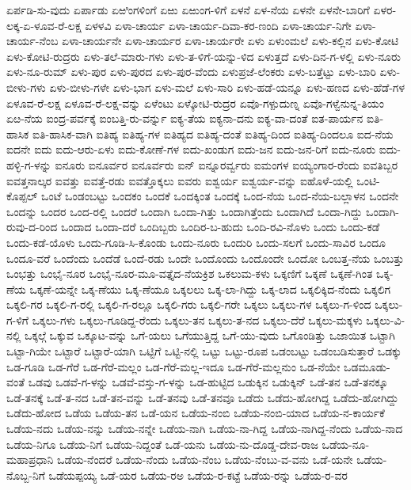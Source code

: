 ಏರ್ಪಡಿ-ಸು-ವುದು
ಏರ್ಪಾಡು
ಏಱಿಂಗಳಿಂಗೆ
ಏಱು
ಏಱುಂಗ-ಳಿಗೆ
ಏಳನೆ
ಏಳ-ನೆಯ
ಏಳನೇ
ಏಳನೇ-ಬಾರಿಗೆ
ಏಳರ-ಲಕ್ಕ-ಏ-ಳೂವ-ರೆ-ಲಕ್ಷ
ಏಳಳವಿ
ಏಳಾ-ಚಾರ್ಯ
ಏಳಾ-ಚಾರ್ಯ-ದಿವಾ-ಕರ-ಣಂದಿ
ಏಳಾ-ಚಾರ್ಯ-ನಿಗೇ
ಏಳಾ-ಚಾರ್ಯ-ನೆಂಬ
ಏಳಾ-ಚಾರ್ಯನೇ
ಏಳಾ-ಚಾರ್ಯರ
ಏಳಾ-ಚಾರ್ಯರೇ
ಏಳು
ಏಳುಂಮಲೆ
ಏಳು-ಕಲ್ಲಿನ
ಏಳು-ಕೋಟಿ
ಏಳು-ಕೋಟಿ-ರುದ್ರರು
ಏಳು-ತಲೆ-ಮಾರು-ಗಳು
ಏಳು-ತ-ಳಿಗೆ-ಯನ್ನು-ಳಿದ
ಏಳುತ್ತದೆ
ಏಳು-ದಿನ-ಗ-ಳಲ್ಲಿ
ಏಳು-ನೂರು
ಏಳು-ನೂ-ರುಮ್
ಏಳು-ಪುರ
ಏಳು-ಪುರದ
ಏಳು-ಪುರ-ವೆಂದು
ಏಳುಪ್ರಜೆ-ಲೆಂಕರು
ಏಳು-ಬತ್ತೆಟ್ಟು
ಏಳು-ಬಾರಿ
ಏಳು-ಬೀಳು-ಗಳು
ಏಳು-ಬೀಳು-ಗಳೇ
ಏಳು-ಭಾಗ
ಏಳು-ಮಲೆ
ಏಳು-ಸಾರಿ
ಏಳು-ಹಡೆ-ಯನ್ನೂ
ಏಳು-ಹಣದ
ಏಳು-ಹೆಡೆ-ಗಳ
ಏಳೂವ-ರೆ-ಲಕ್ಷ
ಏಳೂವ-ರೆ-ಲಕ್ಷ-ವನ್ನು
ಏಳೆಂಟು
ಏಳ್ಕೋಟಿ-ರುದ್ರರ
ಏವೊ-ಗಳ್ಪುದುಣ್ನ
ಏವೊ-ಗಳ್ವೆನುನ್ನ-ತಿಯಂ
ಏೞ-ನೆಯ
ಐಂದ್ರ-ಪರ್ವಕ್ಕೆ
ಐಂಬತ್ತಿ-ರು-ವರ್ನ್ನು
ಐಕ್ಯ-ತೆಯ
ಐಕ್ಯನಾ-ದನು
ಐಕ್ಯ-ವಾ-ದಂತೆ
ಐತ-ಪಾರ್ಯನ
ಐತಿ-ಹಾಸಿಕ
ಐತಿ-ಹಾಸಿಕ-ವಾಗಿ
ಐತಿಹ್ಯ
ಐತಿಹ್ಯ-ಗಳ
ಐತಿಹ್ಯದ
ಐತಿಹ್ಯ-ದಂತೆ
ಐತಿಹ್ಯ-ದಿಂದ
ಐತಿಹ್ಯ-ದಿಂದಲೂ
ಐದ-ನೆಯ
ಐದನೇ
ಐದು
ಐದು-ಆರು-ಏಳು
ಐದು-ಕೋಣೆ-ಗಳ
ಐದು-ಖಂಡುಗ
ಐದು-ಜನ
ಐದು-ಜನ-ರಿಗೆ
ಐದು-ನೂರು
ಐದು-ಹಳ್ಳಿ-ಗ-ಳನ್ನು
ಐನೂರು
ಐನೂರ್ವರ
ಐನೂರ್ವರು
ಐನ್
ಐನ್ನೂರರ್ವ್ವರು
ಐಮಂಗಳ
ಐಯ್ಯಂಗಾರ-ರೆಂದು
ಐವತಿಬ್ಬರ
ಐವತ್ತನಾಲ್ಕರ
ಐವತ್ತು
ಐವತ್ತೆ-ರಡು
ಐವತ್ತೊಕ್ಕಲು
ಐವರು
ಐಶ್ವರ್ಯ
ಐಶ್ವರ್ಯ-ವನ್ನು
ಐಹೊಳೆ-ಯಲ್ಲಿ
ಒಂಟಿ-ಕೊಪ್ಪಲ್
ಒಂಟೆ
ಒಂಡಂಬಟ್ಟು
ಒಂದಕಂ
ಒಂದಕೆ
ಒಂದಕ್ಕಿಂತ
ಒಂದಕ್ಕೆ
ಒಂದ-ನೆಯ
ಒಂದ-ನೆಯ-ಬಲ್ಲಾಳನ
ಒಂದನೇ
ಒಂದನ್ನು
ಒಂದರ
ಒಂದ-ರಲ್ಲಿ
ಒಂದರೆ
ಒಂದಾಗಿ
ಒಂದಾ-ಗಿತ್ತು
ಒಂದಾಗಿತ್ತೆಂದು
ಒಂದಾಗಿದೆ
ಒಂದಾ-ಗಿದ್ದು
ಒಂದಾಗಿ-ರುವು-ದ-ರಿಂದ
ಒಂದಾದ
ಒಂದಾ-ದರೆ
ಒಂದಿಬ್ಬರು
ಒಂದಿರ-ಬ-ಹುದು
ಒಂದಿ-ರವಿ-ನೊಳು
ಒಂದು
ಒಂದು-ಕಡೆ
ಒಂದು-ಕಡೆ-ಯೊಳು
ಒಂದು-ಗೂಡಿ-ಸಿ-ಕೊಂಡು
ಒಂದು-ನೂರು
ಒಂದುರಿ
ಒಂದು-ಸಲಗೆ
ಒಂದು-ಸಾವಿರ
ಒಂದೂ
ಒಂದೂ-ವರೆ
ಒಂದೆಂದು
ಒಂದೆಡೆ
ಒಂದೆ-ರಡು
ಒಂದೇ
ಒಂದೊಂದು
ಒಂದೊಂದೇ
ಒಂದೋ
ಒಂಬತ್ತ-ನೆಯ
ಒಂಬತ್ತು
ಒಂಭತ್ತು
ಒಂಭೈ-ನೂರ
ಒಂಭೈ-ನೂರ-ಮೂ-ವತ್ತೈದ-ನೆಯಕ್ರಿಶ
ಒಕಲುಮ-ಕಳು
ಒಕ್ಕಣಿಗೆ
ಒಕ್ಕಣೆ
ಒಕ್ಕಣೆ-ಗಿಂತ
ಒಕ್ಕ-ಣೆಯ
ಒಕ್ಕಣೆ-ಯನ್ನೇ
ಒಕ್ಕ-ಣೆಯು
ಒಕ್ಕ-ಣೆಯೂ
ಒಕ್ಕಲಲು
ಒಕ್ಕ-ಲಾ-ಗಿದ್ದು
ಒಕ್ಕ-ಲಾದ
ಒಕ್ಕಲಿಕ್ಕಿದ-ನೆಂದು
ಒಕ್ಕಲಿಗ
ಒಕ್ಕಲಿ-ಗರ
ಒಕ್ಕಲಿ-ಗ-ರಲ್ಲಿ
ಒಕ್ಕಲಿ-ಗ-ರಲ್ಲೂ
ಒಕ್ಕಲಿ-ಗರು
ಒಕ್ಕಲಿ-ಗರೇ
ಒಕ್ಕಲು
ಒಕ್ಕಲು-ಗಳ
ಒಕ್ಕಲು-ಗ-ಳಿಂದ
ಒಕ್ಕಲು-ಗ-ಳಿಗೆ
ಒಕ್ಕಲು-ಗಳು
ಒಕ್ಕಲು-ಗೂಡಿದ್ದ-ರೆಂದು
ಒಕ್ಕಲು-ತನ
ಒಕ್ಕಲು-ತ-ನದ
ಒಕ್ಕಲು-ದೆರೆ
ಒಕ್ಕಲು-ಮಕ್ಕಳು
ಒಕ್ಕಲು-ವಿ-ನಲ್ಲಿ
ಒಕ್ಕಲ್ಗೆ
ಒಕ್ಕುವ
ಒಕ್ಕೂಟ-ವನ್ನು
ಒಗೆ-ಯಲು
ಒಗೆಯುತ್ತಿದ್ದ
ಒಗೆ-ಯು-ವುದು
ಒಗೊಂಡಿತ್ತು
ಒಜಾಯಿತ
ಒಟ್ಟಾಗಿ
ಒಟ್ಟಾ-ಗಿಯೇ
ಒಟ್ಟಾರೆ
ಒಟ್ಟಾರೆ-ಯಾಗಿ
ಒಟ್ಟಿಗೆ
ಒಟ್ಟಿ-ನಲ್ಲಿ
ಒಟ್ಟು
ಒಟ್ಟು-ರೂಪ
ಒಡಂಬಟ್ಟು
ಒಡಂಬಡಿಸುತ್ತಾರೆ
ಒಡಕ್ಕು
ಒಡ-ಗೂಡಿ
ಒಡ-ಗೆರೆ
ಒಡ-ಗೆರೆ-ಮಲ್ಲಂ
ಒಡ-ಗೆರೆ-ಮಲ್ಲ-ಇದೂ
ಒಡ-ಗೆರೆ-ಮಲ್ಲನುಂ
ಒಡ-ನೆಯೇ
ಒಡಮೂಡು-ವಂತೆ
ಒಡವು
ಒಡವೆ-ಗ-ಳನ್ನು
ಒಡವೆ-ವಸ್ತು-ಗ-ಳನ್ನು
ಒಡ-ಹುಟ್ಟಿದ
ಒಡುಕ್ಕಿನ
ಒಡುಕ್ಕಿನ್
ಒಡೆ-ತನ
ಒಡೆ-ತನಕ್ಕೂ
ಒಡೆ-ತನಕ್ಕೆ
ಒಡೆ-ತ-ನದ
ಒಡೆ-ತನ-ವನ್ನು
ಒಡೆ-ತನವು
ಒಡೆ-ತನವೂ
ಒಡೆದು
ಒಡೆದು-ಹೋಗಿದ್ದ
ಒಡೆದು-ಹೋಗಿದ್ದು
ಒಡೆದು-ಹೋದ
ಒಡೆಯ
ಒಡೆಯ-ತನ
ಒಡೆ-ಯನ
ಒಡೆಯ-ನಂಬಿ
ಒಡೆಯ-ನಂಬಿ-ಯಾದ
ಒಡೆಯ-ನ-ಕಾರ್ಯಕೆ
ಒಡೆಯ-ನದು
ಒಡೆಯ-ನನ್ನು
ಒಡೆಯ-ನನ್ನೇ
ಒಡೆಯ-ನಾಗಿ
ಒಡೆಯ-ನಾ-ಗಿದ್ದ
ಒಡೆಯ-ನಾಗಿದ್ದ-ನೆಂದು
ಒಡೆಯ-ನಾದ
ಒಡೆಯ-ನಿಗೂ
ಒಡೆಯ-ನಿಗೆ
ಒಡೆಯ-ನಿದ್ದಂತೆ
ಒಡೆ-ಯನು
ಒಡೆಯ-ನು-ದೊಡ್ಡ-ದೇವ-ರಾಜ
ಒಡೆಯ-ನೂ-ಮಹಾಪ್ರಧಾನಿ
ಒಡೆಯ-ನೆಂದರೆ
ಒಡೆಯ-ನೆಂದು
ಒಡೆಯ-ನೆಂಬ
ಒಡೆಯ-ನೆಂಬು-ವ-ವನು
ಒಡೆ-ಯನೇ
ಒಡೆಯ-ನೊಬ್ಬ-ನಿಗೆ
ಒಡೆಯಪ್ಪಯ್ಯ
ಒಡೆ-ಯರ
ಒಡೆಯ-ರಅ
ಒಡೆಯ-ರ-ಕಟ್ಟೆ
ಒಡೆಯ-ರನ್ನು
ಒಡೆಯ-ರ-ವರ
